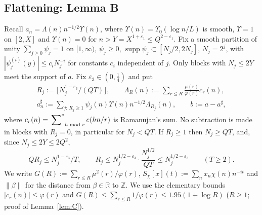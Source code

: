 \providecommand{\cF}{\mathcal{F}}
\providecommand{\sumst}{\sideset{}{^*}\sum}
\providecommand{\Cw}{C_w}
\providecommand{\Lmult}{\Lambda_{\mathrm{mult}}}
\providecommand{\cK}{\mathcal{K}}
\providecommand{\hJ}{\widehat{\mathbf 1_J}}
\providecommand{\ash}{a^\sharp}
\providecommand{\LamR}{\Lambda_R}
\providecommand{\Ups}{\Upsilon}
\providecommand{\Yc}{Y}

\subsection{Flattening: Lemma B}\label{ssec:lemmaB}

Recall $a_n=\Lambda(n)n^{-1/2}\Ups(n)$, where $\Ups(n)=\Ups_0(\log n/L)$ is smooth, $\Ups=1$ on $[2,X]$ and $\Ups(n)=0$ for
$n>\Yc=X^{1+\varepsilon_1}\le Q^{2-\varepsilon_1}$. Fix a smooth partition of unity $\sum_{j\ge0}\psi_j=1$ on $[1,\infty)$, $\psi_j\ge0$,
$\operatorname{supp}\psi_j\subset[N_j/2,2N_j]$, $N_j=2^j$, with $|\psi_j^{(i)}(y)|\le c_iN_j^{-i}$ for constants $c_i$ independent of $j$. Only
blocks with $N_j\le2\Yc$ meet the support of $a$. Fix $\varepsilon_3\in(0,\frac14)$ and put
\begin{gather*}
 R_j:=\big\lfloor N_j^{1-\varepsilon_3}/(QT)\big\rfloor,\qquad
 \LamR(n):=\sum_{r\le R}\frac{\mu(r)}{\varphi(r)}c_r(n),\\
 \ash_n:=\sum_{j:\,R_j\ge1}\psi_j(n)\Ups(n)n^{-1/2}\Lambda_{R_j}(n),\qquad b:=a-\ash ,
\end{gather*}
where $c_r(n)=\sumst_{h\bmod r}e(hn/r)$ is Ramanujan's sum. No subtraction is made in blocks with $R_j=0$, in particular for $N_j<QT$.
If $R_j\ge1$ then $N_j\ge QT$, and, since $N_j\le2\Yc\le2Q^2$,
\begin{equation}\label{eqB:Rj}
 QR_j\le N_j^{1-\varepsilon_3}/T,\qquad R_j\le N_j^{1/2-\varepsilon_3}\cdot\frac{N_j^{1/2}}{QT}\le N_j^{1/2-\varepsilon_3}\qquad(T\ge2).
\end{equation}
We write $G(R):=\sum_{r\le R}\mu^2(r)/\varphi(r)$, $S_\chi[x](t):=\sum_nx_n\chi(n)n^{-it}$ and $\|\beta\|$ for the distance from
$\beta\in\mathbb R$ to $\mathbb Z$. We use the elementary bounds $|c_r(n)|\le\varphi(r)$ and
$G(R)\le\sum_{r\le R}1/\varphi(r)\le1.95(1+\log R)$ ($R\ge1$; proof of Lemma~\ref{lem:C}).

